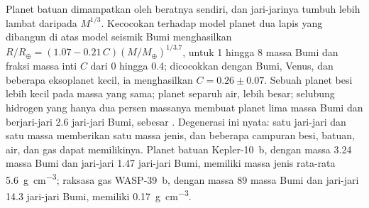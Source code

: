 Planet batuan dimampatkan oleh beratnya sendiri, dan jari-jarinya tumbuh
lebih lambat daripada $M^{1/3}$. Kecocokan terhadap model planet dua lapis yang dibangun di atas
model seismik Bumi menghasilkan $R/R_\oplus = (1.07 - 0.21\,C)
(M/M_\oplus)^{1/3.7}$, untuk 1 hingga 8 massa Bumi dan fraksi massa inti
$C$ dari 0 hingga 0.4; dicocokkan dengan Bumi, Venus, dan beberapa eksoplanet kecil,
ia menghasilkan $C = 0.26 \pm 0.07$. Sebuah
planet besi lebih kecil pada massa yang sama; planet separuh air, lebih besar;
selubung hidrogen yang hanya dua persen massanya membuat planet
lima massa Bumi dan berjari-jari \num{2.6} jari-jari Bumi, sebesar
. Degenerasi ini nyata: satu jari-jari dan satu massa memberikan satu
massa jenis, dan beberapa campuran besi, batuan, air, dan gas dapat memilikinya.
Planet batuan Kepler-10~b, dengan massa 3.24 massa Bumi dan jari-jari 1.47 jari-jari Bumi,
memiliki massa jenis rata-rata \qty{5.6}{g.cm^{-3}}; raksasa gas WASP-39~b,
dengan massa 89 massa Bumi dan jari-jari 14.3 jari-jari Bumi, memiliki \qty{0.17}{g.cm^{-3}}.

